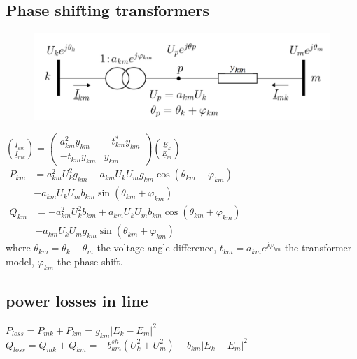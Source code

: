 \documentclass[a4paper,10pt,landscape]{scrartcl}
\begin{document}
\begin{multicols*}{3}
\subsection{Phase shifting transformers}
\begin{figure}[H]
    \centering
    \includegraphics[width=\linewidth]{src/image.png}
\end{figure}
$\binom{\underline{I}_{k m}}{\underline{I}_{m k}}=\left(\begin{array}{cc}a_{k m}^2 y_{k m} & -t_{k m}^* y_{k m} \\ -t_{k m} y_{k m} & y_{k m}\end{array}\right)\binom{\underline{E}_k}{\underline{E}_m}$ \\
$\begin{aligned} P_{k m} & =a_{k m}^2 U_k^2 g_{k m}-a_{k m} U_k U_m g_{k m} \cos \left(\theta_{k m}+\varphi_{k m}\right) \\ & -a_{k m} U_k U_m b_{k m} \sin \left(\theta_{k m}+\varphi_{k m}\right)\end{aligned}$
$\begin{aligned} Q_{k m} & =-a_{k m}^2 U_k^2 b_{k m}+a_{k m} U_k U_m b_{k m} \cos \left(\theta_{k m}+\varphi_{k m}\right) \\ & -a_{k m} U_k U_m g_{k m} \sin \left(\theta_{k m}+\varphi_{k m}\right)\end{aligned}$ \\
where $\theta_{km}=\theta_k-\theta_m$ the voltage angle difference, $t_{km}=a_{km}e^{j\varphi_{km}}$ the transformer model, $\varphi_{km}$ the phase shift.

\subsection{power losses in line}
$P_{loss}=P_{mk}+P_{km}=g_{km}|E_k-E_m|^2$ \\
$Q_{loss}=Q_{mk}+Q_{km}=-b_{km}^{sh}(U_k^2+U_m^2)-b_{km}|E_k-E_m|^2$


\end{multicols*}
\end{document}
